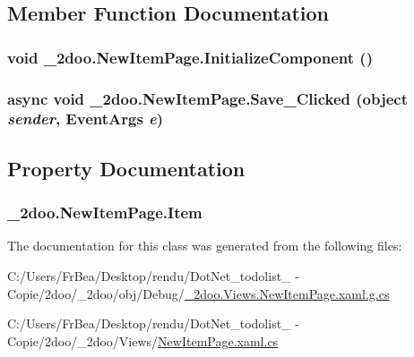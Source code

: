 \subsection{Member Function Documentation}
\hypertarget{class__2doo_1_1_new_item_page_6aa87c4d56fd5df38bb8ccb2881d72c4}{
\subsubsection[{InitializeComponent}]{\setlength{\rightskip}{0pt plus 5cm}void \_\-2doo.NewItemPage.InitializeComponent ()}}
\label{class__2doo_1_1_new_item_page_6aa87c4d56fd5df38bb8ccb2881d72c4}


\hypertarget{class__2doo_1_1_new_item_page_52ecee4a105f3d4bba6802b55714b0bc}{
\subsubsection[{Save\_\-Clicked}]{\setlength{\rightskip}{0pt plus 5cm}async void \_\-2doo.NewItemPage.Save\_\-Clicked (object {\em sender}, \/  EventArgs {\em e})}}
\label{class__2doo_1_1_new_item_page_52ecee4a105f3d4bba6802b55714b0bc}




\subsection{Property Documentation}
\hypertarget{class__2doo_1_1_new_item_page_f2d7a5ff4bb1bf0a26edfc60c1d2b5d0}{
\subsubsection[{Item}]{ \_\-2doo.NewItemPage.Item}}
\label{class__2doo_1_1_new_item_page_f2d7a5ff4bb1bf0a26edfc60c1d2b5d0}




The documentation for this class was generated from the following files:\begin{CompactItemize}
\item 
C:/Users/FrBea/Desktop/rendu/DotNet\_\-todolist\_ - Copie/2doo/\_\-2doo/obj/Debug/\hyperlink{__2doo_8_views_8_new_item_page_8xaml_8g_8cs}{\_\-2doo.Views.NewItemPage.xaml.g.cs}\item 
C:/Users/FrBea/Desktop/rendu/DotNet\_\-todolist\_ - Copie/2doo/\_\-2doo/Views/\hyperlink{_new_item_page_8xaml_8cs}{NewItemPage.xaml.cs}\end{CompactItemize}
